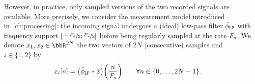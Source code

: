 However, in practice, only sampled versions of the two recorded signals are available.
More precisely, we consider the measurement model introduced in~\cref{ch:processing}:
the incoming signal undergoes a (ideal) low-pass filter $\lowpassfilter$ with frequency support $\kintervcc{\sfrac{-\Fs}{2}}{\sfrac{\Fs}{2}}$ before being regularly sampled at the rate $F_s$.
We denote $\disRecordedSignal_1,\disRecordedSignal_2\in\bbR^{2N}$ the two vectors of $2N$ (consecutive) samples and $i\in\{1, 2\}$ by
\begin{equation}
    \label{eq:blaster:measurement-process}
    \disRecordedSignal_i[n] =
    \kparen{\idealLowPassFilter \convDis \contRecordedSignal}\kparen{\frac{n}{\Fs}}
    \qquad
    \forall n \in\{0, \dots, 2N-1\}
    .
\end{equation}







